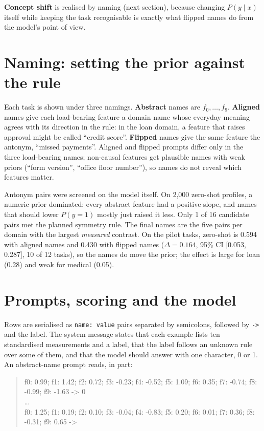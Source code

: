 \textbf{Concept shift} is realised by naming (next section), because changing $P(y \mid x)$ itself while keeping the task recognisable is exactly what flipped names do from the model's point of view.

\section{Naming: setting the prior against the rule}
\label{sec:naming}

Each task is shown under three namings.
\textbf{Abstract} names are $f_0, \ldots, f_9$.
\textbf{Aligned} names give each load-bearing feature a domain name whose everyday meaning agrees with its direction in the rule: in the loan domain, a feature that raises approval might be called ``credit score''.
\textbf{Flipped} names give the same feature the antonym, ``missed payments''.
Aligned and flipped prompts differ only in the three load-bearing names; non-causal features get plausible names with weak priors (``form version'', ``office floor number''), so names do not reveal which features matter.

Antonym pairs were screened on the model itself.
On 2,000 zero-shot profiles, a numeric prior dominated: every abstract feature had a positive slope, and names that should lower $P(y = 1)$ mostly just raised it less.
Only 1 of 16 candidate pairs met the planned symmetry rule.
The final names are the five pairs per domain with the largest \emph{measured} contrast.
On the pilot tasks, zero-shot \AUROC is 0.594 with aligned names and 0.430 with flipped names ($\Delta = 0.164$, 95\% CI [0.053, 0.287], 10 of 12 tasks), so the names do move the prior; the effect is large for loan (0.28) and weak for medical (0.05).

\section{Prompts, scoring and the model}
\label{sec:prompts}

Rows are serialised as \texttt{name: value} pairs separated by semicolons, followed by \texttt{->} and the label.
The system message states that each example lists ten standardised measurements and a label, that the label follows an unknown rule over some of them, and that the model should answer with one character, 0 or 1.
An abstract-name prompt reads, in part:

\begin{quote}\small\ttfamily
f0: 0.99; f1: 1.42; f2: 0.72; f3: -0.23; f4: -0.52; f5: 1.09; f6: 0.35; f7: -0.74; f8: -0.99; f9: -1.63 -> 0\\
\ldots\\
f0: 1.25; f1: 0.19; f2: 0.10; f3: -0.04; f4: -0.83; f5: 0.20; f6: 0.01; f7: 0.36; f8: -0.31; f9: 0.65 ->
\end{quote}

